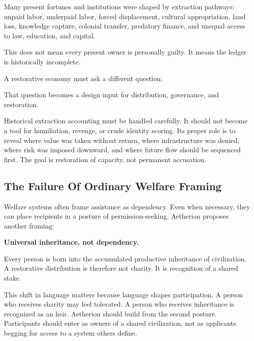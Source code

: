 \documentclass[12pt]{article}
\begin{document}
Many present fortunes and institutions were shaped by extraction pathways: unpaid labor, underpaid labor, forced displacement, cultural appropriation, land loss, knowledge capture, colonial transfer, predatory finance, and unequal access to law, education, and capital.

This does not mean every present owner is personally guilty. It means the ledger is historically incomplete.

A restorative economy must ask a different question:


That question becomes a design input for distribution, governance, and restoration.

Historical extraction accounting must be handled carefully. It should not become a tool for humiliation, revenge, or crude identity scoring. Its proper role is to reveal where value was taken without return, where infrastructure was denied, where risk was imposed downward, and where future flow should be sequenced first. The goal is restoration of capacity, not permanent accusation.

\subsection{The Failure Of Ordinary Welfare Framing}

Welfare systems often frame assistance as dependency. Even when necessary, they can place recipients in a posture of permission-seeking. Aetherion proposes another framing:

\begin{center}
\textbf{Universal inheritance, not dependency.}
\end{center}

Every person is born into the accumulated productive inheritance of civilization. A restorative distribution is therefore not charity. It is recognition of a shared stake.

This shift in language matters because language shapes participation. A person who receives charity may feel tolerated. A person who receives inheritance is recognized as an heir. Aetherion should build from the second posture. Participants should enter as owners of a shared civilization, not as applicants begging for access to a system others define.
\end{document}
